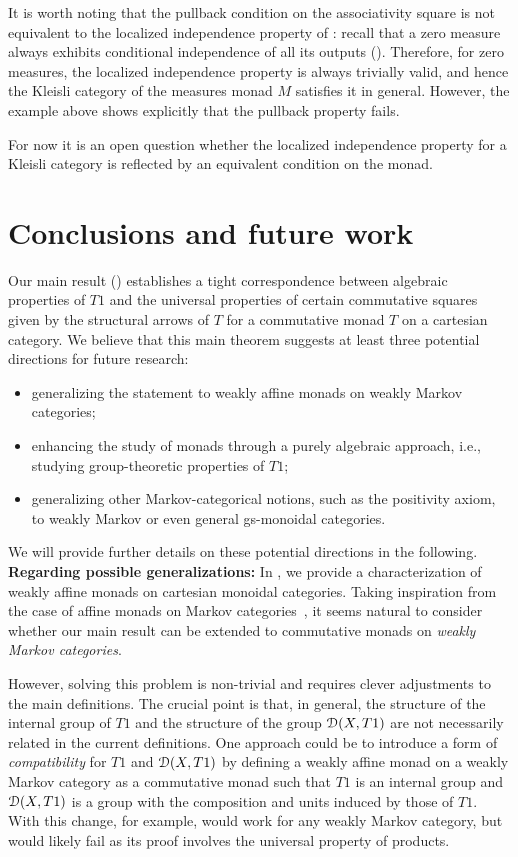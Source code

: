 \documentclass[a4paper,UKenglish,numberwithinsect,cleveref, autoref, thm-restate]{lipics-v2021}
\theoremstyle{plain} %
\theoremstyle{definition} %
\begin{document}
It is worth noting that the pullback condition on the associativity square is not equivalent to the localized independence property of : recall that a zero measure always exhibits conditional independence of all its outputs ().
Therefore, for zero measures, the localized independence property is always trivially valid, and hence the Kleisli category of the measures monad $M$ satisfies it in general.
However, the example above shows explicitly that the pullback property fails.

For now it is an open question whether the localized independence property for a Kleisli category is reflected by an equivalent condition on the monad.


\section{Conclusions and future work}
\label{secfurther}


Our main result () establishes a tight correspondence between algebraic properties of $T1$ and the universal properties of certain commutative squares given by the structural arrows of $T$ for a commutative monad $T$ on a cartesian category.
We believe that this main theorem suggests at least three potential directions for future research:
\begin{itemize}
\item generalizing the statement to weakly affine monads on weakly Markov categories;
\item enhancing the study of monads through a purely algebraic approach, i.e., studying group-theoretic properties of $T1$;
\item generalizing other Markov-categorical notions, such as the positivity axiom, to weakly Markov or even general gs-monoidal categories.
\end{itemize} 
We will provide further details on these potential directions in the following.
\\

\textbf{Regarding possible generalizations:} In , we provide a characterization of weakly affine monads on cartesian monoidal categories. Taking inspiration from the case of affine monads on Markov categories~\cite[Corollary~3.2]{Fritz_2020}, it seems natural to consider whether our main result can be extended to commutative monads on \emph{weakly Markov categories}.

However, solving this problem is non-trivial and requires clever adjustments to the main definitions. The crucial point is that, in general, the structure of the internal group of $T1$ and the structure of the group $\mathcal{D}(X,T1)$ are not necessarily related in the current definitions. One approach could be to introduce a form of \emph{compatibility} for $T1$ and $\mathcal{D}(X,T1)$ by defining a weakly affine monad on a weakly Markov category as a commutative monad such that $T1$ is an internal group and $\mathcal{D}(X,T1)$ is a group with the composition and units induced by those of $T1$. With this change, for example,  would work for any weakly Markov category, but  would likely fail as its proof involves the universal property of products. 
\\
\end{document}

